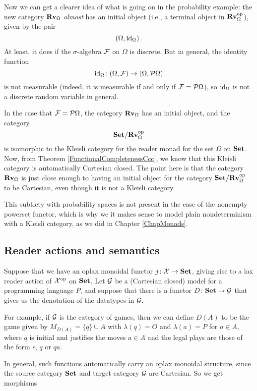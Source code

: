 \documentclass{article}
\begin{document}
Now we can get a clearer idea of what is going on in the probability example: the new category ${\normalfont\textbf{Rv}}_\Omega$ \emph{almost} has an initial object (i.e., a terminal object in ${\normalfont\textbf{Rv}}_\Omega^{\mathrm{op}}$), given by the pair
\[
  (\Omega,\operatorname{id}_\Omega)\,.
  \]
At least, it does if the $\sigma$-algebra $\mathcal F$ on $\Omega$ is discrete.  
But in general, the identity function
\[
  \operatorname{id}_\Omega \colon (\Omega,\mathcal F) \to (\Omega,\mathcal P\Omega)
  \]
is not measurable (indeed, it is measurable if and only if $\mathcal F=\mathcal P\Omega$), so $\operatorname{id}_\Omega$ is not a discrete random variable in general.

In the case that $\mathcal F=\mathcal P\Omega$, the category ${\normalfont\textbf{Rv}}_\Omega$ has an initial object, and the category
\[
  {\normalfont\textbf{Set}}/{\normalfont\textbf{Rv}}_\Omega^{\mathrm{op}}
  \]
is isomorphic to the Kleisli category for the reader monad for the set $\Omega$ on ${\normalfont\textbf{Set}}$.  
Now, from Theorem \ref{FunctionalCompletenessCcc}, we know that this Kleisli category is automatically Cartesian closed.  
The point here is that the category ${\normalfont\textbf{Rv}}_\Omega$ is just close enough to having an initial object for the category ${\normalfont\textbf{Set}}/{\normalfont\textbf{Rv}}_\Omega^{\mathrm{op}}$ to be Cartesian, even though it is not a Kleisli category.

\begin{remark}
  This subtlety with probability spaces is not present in the case of the nonempty powerset functor, which is why we it makes sense to model plain nondeterminism with a Kleisli category, as we did in Chapter \ref{ChapMonads}.
\end{remark}

\subsection{Reader actions and semantics}

Suppose that we have an oplax monoidal functor $j \colon \mathcal X \to {\normalfont\textbf{Set}}$, giving rise to a lax reader action of $\mathcal X^{\mathrm{op}}$ on ${\normalfont\textbf{Set}}$.
Let $\mathcal G$ be a (Cartesian closed) model for a programming language $P$, and suppose that there is a functor $D\colon {\normalfont\textbf{Set}} \to \mathcal G$ that gives us the denotation of the datatypes in $\mathcal G$.

For example, if $\mathcal G$ is the category of games, then we can define $D(A)$ to be the game given by $M_{D(A)} = \{q\}\cup A$ with $\lambda(q)=O$ and $\lambda(a)=P$ for $a\in A$, where $q$ is initial and justifies the moves $a\in A$ and the legal plays are those of the form $\epsilon$, $q$ or $qa$.

In general, such functions automatically carry an oplax monoidal structure, since the source category ${\normalfont\textbf{Set}}$ and target category $\mathcal G$ are Cartesian.  
So we get morphisms
\end{document}
